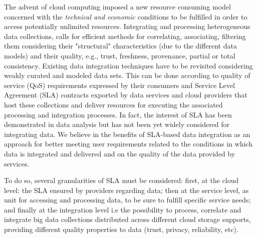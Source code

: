 %


\color{black}
The advent of cloud computing imposed a new   resource consuming model concerned
with the \textit{technical and economic} conditions to be fulfilled in order to access potentially unlimited resources. Integrating and processing heterogeneous data collections, calls for efficient methods for correlating, associating, filtering them considering their "structural" characteristics (due to the different data models) and  their quality, e.g., trust, freshness, provenance, partial or total consistency. 
Existing data integration techniques have to be revisited considering weakly curated and modeled data sets. This can be done according to quality of service (QoS) requirements expressed by their consumers and Service Level Agreement (SLA) contracts exported by data services and cloud providers that host  these collections and deliver resources for executing the associated processing and integration processes.
In fact,  the interest of SLA has been demonstrated  in data analysis but has not been yet widely considered for integrating data. 
We believe in the benefits of SLA-based data integration as an approach for better meeting  user  requirements related to the conditions in which data is integrated and delivered and on the quality of the data provided by services.

To do so, several granularities of SLA must be considered: first, at the cloud level: the SLA ensured by providers regarding data; then at the service level, as unit for accessing and processing data, to be sure to fulfill  specific service needs; and finally at the integration level i.e the possibility to process, correlate and integrate big data collections distributed across different cloud storage supports, providing different quality properties to data (trust, privacy, reliability, etc).



